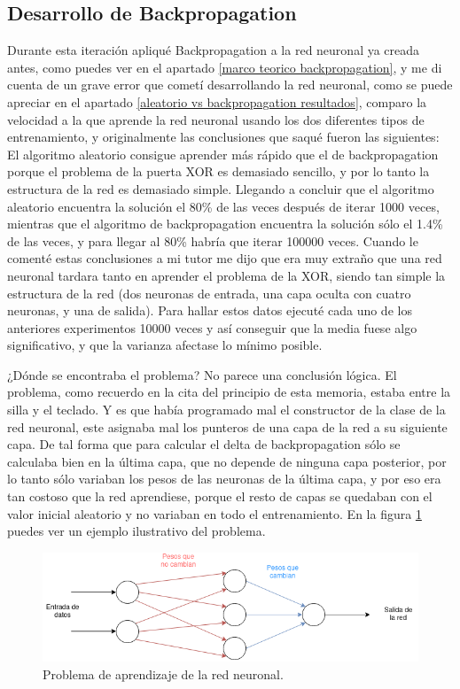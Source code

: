 \subsection{Desarrollo de Backpropagation}
Durante esta iteración apliqué Backpropagation a la red neuronal ya creada antes, como puedes ver en el apartado \ref{marco teorico backpropagation}, y me di cuenta de un grave error que cometí desarrollando la red neuronal, como se puede apreciar en el apartado \ref{aleatorio vs backpropagation resultados}, comparo la velocidad a la que aprende la red neuronal usando los dos diferentes tipos de entrenamiento, y originalmente las conclusiones que saqué fueron las siguientes:
\\
El algoritmo aleatorio consigue aprender más rápido que el de backpropagation porque el problema de la puerta XOR es demasiado sencillo, y por lo tanto la estructura de la red es demasiado simple. Llegando a concluir que el algoritmo aleatorio encuentra la solución el 80\% de las veces después de iterar 1000 veces, mientras que el algoritmo de backpropagation encuentra la solución sólo el 1.4\% de las veces, y para llegar al 80\% habría que iterar 100000 veces. Cuando le comenté estas conclusiones a mi tutor me dijo que era muy extraño que una red neuronal tardara tanto en aprender el problema de la XOR, siendo tan simple la estructura de la red (dos neuronas de entrada, una capa oculta con cuatro neuronas, y una de salida). Para hallar estos datos ejecuté cada uno de los anteriores experimentos 10000 veces y así conseguir que la media fuese algo significativo, y que la varianza afectase lo mínimo posible.

¿Dónde se encontraba el problema? No parece una conclusión lógica. El problema, como recuerdo en la cita del principio de esta memoria, estaba entre la silla y el teclado. Y es que había programado mal el constructor de la clase de la red neuronal, este asignaba mal los punteros de una capa de la red a su siguiente capa. De tal forma que para calcular el delta de backpropagation sólo se calculaba bien en la última capa, que no depende de ninguna capa posterior, por lo tanto sólo variaban los pesos de las neuronas de la última capa, y por eso era tan costoso que la red aprendiese, porque el resto de capas se quedaban con el valor inicial aleatorio y no variaban en todo el entrenamiento. En la figura \ref{problema aprendizaje red neuronal} puedes ver un ejemplo ilustrativo del problema.
\begin{figure}[H]
	\centering
	\includegraphics[width=15cm]{archivos/imagenes/problema-de-aprendizaje-red.png}
	\caption{Problema de aprendizaje de la red neuronal.}
	 \label{problema aprendizaje red neuronal}
\end{figure}

